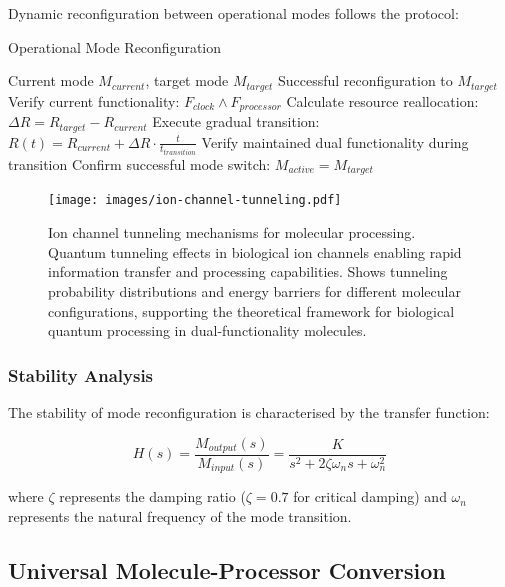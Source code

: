 \documentclass[12pt,a4paper]{article}
\begin{document}
Dynamic reconfiguration between operational modes follows the protocol:

\begin{algorithm}[H]
\caption{Operational Mode Reconfiguration}
\begin{algorithmic}[1]
\REQUIRE Current mode $M_{current}$, target mode $M_{target}$
\ENSURE Successful reconfiguration to $M_{target}$
\STATE Verify current functionality: $F_{clock} \land F_{processor}$
\STATE Calculate resource reallocation: $\Delta R = R_{target} - R_{current}$
\STATE Execute gradual transition: $R(t) = R_{current} + \Delta R \cdot \frac{t}{t_{transition}}$
\STATE Verify maintained dual functionality during transition
\STATE Confirm successful mode switch: $M_{active} = M_{target}$
\end{algorithmic}
\end{algorithm}

\begin{figure}[H]
    \centering
    \texttt{[image: images/ion-channel-tunneling.pdf]}
    \caption{Ion channel tunneling mechanisms for molecular processing. Quantum tunneling effects in biological ion channels enabling rapid information transfer and processing capabilities. Shows tunneling probability distributions and energy barriers for different molecular configurations, supporting the theoretical framework for biological quantum processing in dual-functionality molecules.}
    \label{fig:ion_tunneling}
\end{figure}


\subsubsection{Stability Analysis}

The stability of mode reconfiguration is characterised by the transfer function:

\begin{equation}
H(s) = \frac{M_{output}(s)}{M_{input}(s)} = \frac{K}{s^2 + 2\zeta\omega_n s + \omega_n^2}
\end{equation}

where $\zeta$ represents the damping ratio ($\zeta = 0.7$ for critical damping) and $\omega_n$ represents the natural frequency of the mode transition.

\subsection{Universal Molecule-Processor Conversion}
\end{document}

